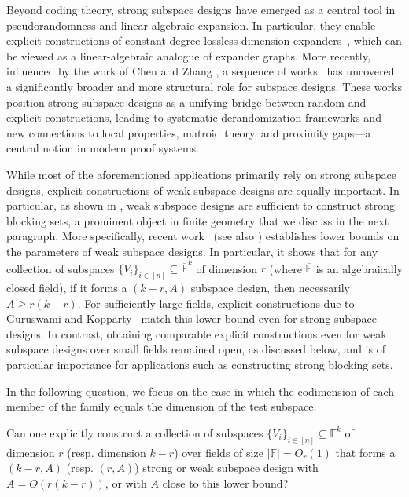 \documentclass[11pt]{article}
\begin{document}
Beyond coding theory, strong subspace designs have emerged as a central tool in pseudorandomness and linear-algebraic expansion. In particular, they enable explicit constructions of constant-degree lossless dimension expanders~\cite{guruswami2021lossless}, which can be viewed as a linear-algebraic analogue of expander graphs.
More recently, influenced by the work of Chen and Zhang \cite{chen2025explicit}, a sequence of works~\cite{brakensiek2025random,brakensiek2025combinatorial,Goyal2025OptimalPG} has uncovered a significantly broader and more structural role for subspace designs. These works position strong subspace designs as a unifying bridge between random and explicit constructions, leading to systematic derandomization frameworks and new connections to local properties, matroid theory, and proximity gaps---a central notion in modern proof systems. 

While most of the aforementioned applications primarily rely on strong subspace designs, explicit constructions of weak subspace designs are equally important. In particular, as shown in \cite{FZ14,FZ16}, weak subspace designs are sufficient to construct strong blocking sets, a prominent object in finite geometry that we discuss in the next paragraph. %
More specifically, recent work~\cite{brakensiek2025random} (see also \cite{FZ16,Guo24}) establishes lower bounds on the parameters of weak subspace designs. In particular, it shows that for any collection of subspaces $\{V_i\}_{i\in[n]} \subseteq \overline{\mathbb{F}}^k$ of dimension $r$ (where $\overline{\mathbb{F}}$ is an algebraically closed field), if it forms a $(k-r, A)$ subspace design, then necessarily $A \ge r(k-r)$.
For sufficiently large fields, explicit constructions due to Guruswami and Kopparty~\cite{guruswami2016explicit} match this lower bound even for strong subspace designs. In contrast, obtaining comparable explicit constructions even for weak subspace designs over small fields remained open, as discussed below, and is of particular importance for applications such as constructing strong blocking sets.

In the following question, we focus on the case in which the codimension of
each member of the family equals the dimension of the test subspace.

\begin{question}\label{q2}
    Can one explicitly construct a collection of subspaces $\{V_i\}_{i\in[n]} \subseteq \mathbb{F}^k$ of dimension $r$ (resp. dimension $k-r$) over fields of size $|\mathbb{F}| = O_r(1)$ that forms a $(k-r,A)$ (resp. $(r, A)$) strong or weak subspace design with $A = O(r(k-r))$, or with $A$ close to this lower bound?
\end{question}
\end{document}
